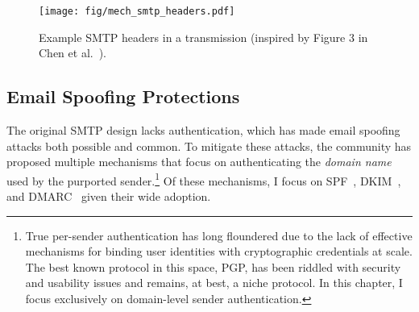 



\begin{figure}[t]
    \centerline{\texttt{[image: fig/mech\_smtp\_headers.pdf]}}
    \centering
    \caption[Example SMTP Headers]{Example SMTP headers in a transmission (inspired by Figure 3 in Chen et al.~\cite{chen2020composition}).}
    \label{fig:mech_smtp_headers}
\end{figure}

\subsection{Email Spoofing Protections}
The original SMTP design lacks authentication, which
has made email spoofing attacks both possible and common. To mitigate these attacks, the community has proposed multiple mechanisms that focus on authenticating the \emph{domain name} used by the
purported sender.\footnote{True per-sender authentication has long floundered
  due to the lack of effective mechanisms for binding user identities
  with cryptographic credentials at scale.  The best known protocol in
  this space, PGP, has been riddled with security and usability issues
  and remains, at best, a niche protocol.  In this chapter, I focus
  exclusively on domain-level sender authentication.} Of these
mechanisms, I focus on SPF~\cite{rfc7208}, DKIM~\cite{rfc6376}, and DMARC~\cite{rfc7489} given their wide adoption.

